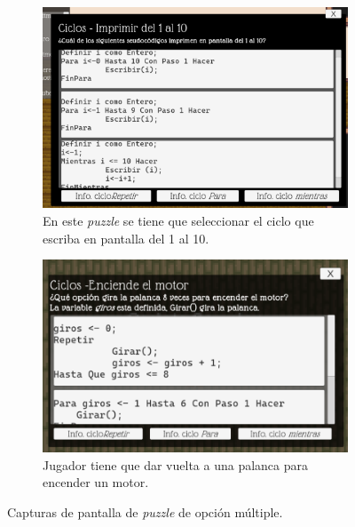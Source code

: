 \begin{itemize}
\begin{figure}[H]
\begin{subfigure}{0.4\textwidth}
            \label{fig:puzzle_opmul_ciclos_for}
        \end{subfigure}
        \begin{subfigure}{0.4\textwidth}
            \centering
            \includegraphics[width=\textwidth]{images/OpcionMultiple2.png}
            \caption{En este \textit{puzzle} se tiene que seleccionar el ciclo que escriba en pantalla del 1 al 10.}
            \label{fig:puzzle_opmul_ciclos_while}
        \end{subfigure}
        \begin{subfigure}{0.4\textwidth}
            \centering
            \includegraphics[width=\textwidth]{images/OpcionMultiple3.png}
            \caption{Jugador tiene que dar vuelta a una palanca para encender un motor.}
            \label{fig:puzzle_opmul_ciclos_while_2}
        \end{subfigure}
        \caption{Capturas de pantalla de \textit{puzzle} de opción múltiple.}

\end{figure}
\end{itemize}
